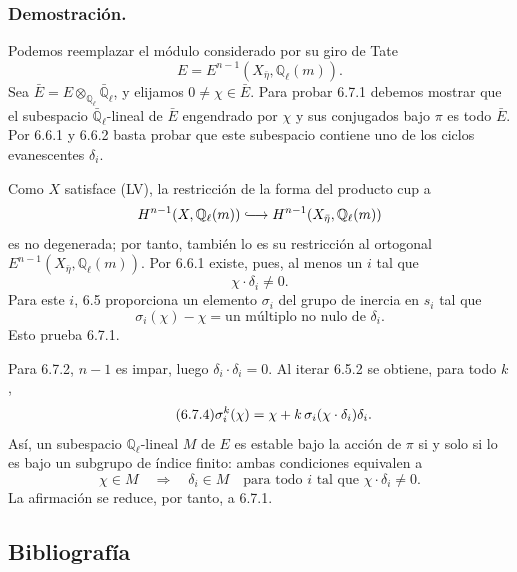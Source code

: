 \subsubsection*{Demostración.}

Podemos reemplazar el módulo considerado por su giro de Tate
\[
E=E^{n-1}(X_{\bar\eta},\mathbb Q_\ell(m)).
\]
Sea $\bar E=E\otimes_{\mathbb Q_\ell}\bar{\mathbb Q}_\ell$, y elijamos
$0\ne\chi\in\bar E$. Para probar 6.7.1 debemos mostrar que el subespacio
$\bar{\mathbb Q}_\ell$-lineal de $\bar E$ engendrado por $\chi$ y sus
conjugados bajo $\pi$ es todo $\bar E$. Por 6.6.1 y 6.6.2 basta probar
que este subespacio contiene uno de los ciclos evanescentes $\delta_i$.

Como $X$ satisface (LV), la restricción de la forma del producto cup a
\[
H^{n-1}(X,\mathbb Q_\ell(m))
\lhook\joinrel\longrightarrow
H^{n-1}(X_{\bar\eta},\mathbb Q_\ell(m))
\]
es no degenerada; por tanto, también lo es su restricción al ortogonal
$E^{n-1}(X_{\bar\eta},\mathbb Q_\ell(m))$. Por 6.6.1 existe, pues, al
menos un $i$ tal que
\[
\chi\cdot\delta_i\ne0.
\]
Para este $i$, 6.5 proporciona un elemento $\sigma_i$ del grupo de
inercia en $s_i$ tal que
\begin{equation}\tag{6.7.3}
\sigma_i(\chi)-\chi
=\text{un múltiplo no nulo de }\delta_i.
\end{equation}
Esto prueba 6.7.1.

\pageoriginale

Para 6.7.2, $n-1$ es impar, luego
$\delta_i\cdot\delta_i=0$. Al iterar 6.5.2 se obtiene, para todo $k$,
\begin{equation}\tag{6.7.4}
\sigma_i^k(\chi)
=\sisi{X}{\chi}
+k\,\sigma_i(\sisi{x}{\chi}\cdot\delta_i)\delta_i.
\end{equation}
Así, un subespacio $\mathbb Q_\ell$-lineal $M$ de $E$ es estable bajo
la acción de $\pi$ si y solo si lo es bajo un subgrupo de índice finito:
ambas condiciones equivalen a
\[
\chi\in M
\quad\Longrightarrow\quad
\delta_i\in M\quad\text{para todo $i$ tal que }
\chi\cdot\delta_i\ne0.
\]
La afirmación se reduce, por tanto, a 6.7.1.

\subsection*{Bibliografía}

